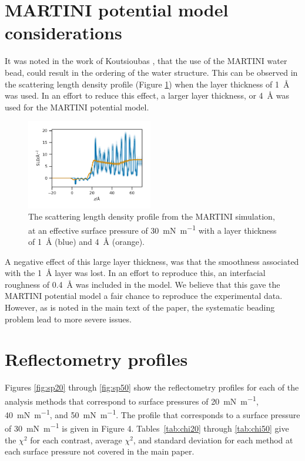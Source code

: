 \documentclass[amsmath,amssymb,superscriptaddress]{revtex4-1}
\begin{document}
\section{MARTINI potential model considerations}
It was noted in the work of Koutsioubas \cite{koutsioubas_combined_2016}, that the use of the MARTINI water bead, could result in the ordering of the water structure.
This can be observed in the scattering length density profile (Figure \ref{fig:mart}) when the layer thickness of \SI{1}{\angstrom} was used.
In an effort to reduce this effect, a larger layer thickness, or \SI{4}{\angstrom} was used for the MARTINI potential model.
%
\begin{figure}
 \centering
 \includegraphics[width=0.49\textwidth]{martiniorder}
 \caption{The scattering length density profile from the MARTINI simulation, at an effective surface pressure of \SI{30}{\milli\newton\per\meter} with a layer thickness of \SI{1}{\angstrom} (blue) and \SI{4}{\angstrom} (orange). }
 \label{fig:mart}
\end{figure}
%

A negative effect of this large layer thickness, was that the smoothness associated with the \SI{1}{\angstrom} layer was lost.
In an effort to reproduce this, an interfacial roughness of \SI{0.4}{\angstrom} was included in the model.
We believe that this gave the MARTINI potential model a fair chance to reproduce the experimental data.
However, as is noted in the main text of the paper, the systematic beading problem lead to more severe issues.

\section{Reflectometry profiles}
Figures \ref{fig:sp20} through \ref{fig:sp50} show the reflectometry profiles for each of the analysis methods that correspond to surface pressures of \SI{20}{\milli\newton\per\meter}, \SI{40}{\milli\newton\per\meter}, and \SI{50}{\milli\newton\per\meter}.
The profile that corresponds to a surface pressure of \SI{30}{\milli\newton\per\meter} is given in Figure 4.
Tables~\ref{tab:chi20} through \ref{tab:chi50} give the $\chi^2$ for each contrast, average $\chi^2$, and standard deviation for each method at each surface pressure not covered in the main paper.
\end{document}
